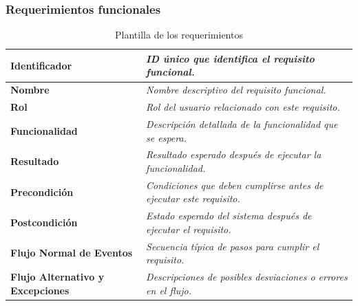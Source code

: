 \subsubsection{Requerimientos funcionales}

\begin{table}[!htb]
    \centering
    \caption{Plantilla de los requerimientos}
    \begin{tabular}{|p{3cm}|p{10cm}|}
    \hline
    \textbf{Identificador} & \textit{ID único que identifica el requisito funcional.} \\ \hline
    \textbf{Nombre} & \textit{Nombre descriptivo del requisito funcional.} \\ \hline
    \textbf{Rol} & \textit{Rol del usuario relacionado con este requisito.} \\ \hline
    \textbf{Funcionalidad} & \textit{Descripción detallada de la funcionalidad que se espera.} \\ \hline
    \textbf{Resultado} & \textit{Resultado esperado después de ejecutar la funcionalidad.} \\ \hline
    \textbf{Precondición} & \textit{Condiciones que deben cumplirse antes de ejecutar este requisito.} \\ \hline
    \textbf{Postcondición} & \textit{Estado esperado del sistema después de ejecutar el requisito.} \\ \hline
    \textbf{Flujo Normal de Eventos} & \textit{Secuencia típica de pasos para cumplir el requisito.} \\ \hline
    \textbf{Flujo Alternativo y Excepciones} & \textit{Descripciones de posibles desviaciones o errores en el flujo.} \\ \hline
    \end{tabular}
    \label{tabla:req-funcionales}
\end{table}
\FloatBarrier


